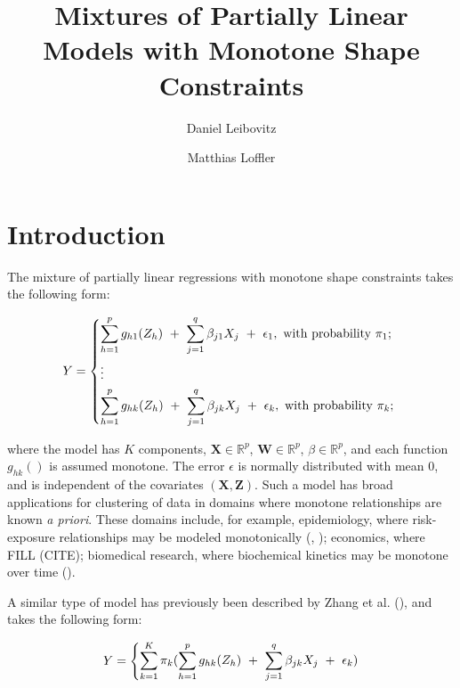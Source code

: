 \documentclass[fleqn,10pt]{olplainarticle}\usepackage[]{graphicx}\usepackage[]{color}
\title{Mixtures of Partially Linear Models with Monotone Shape Constraints}
\author[1]{Daniel Leibovitz}
\author[2]{Matthias Loffler}
\affil[1]{daniel.leibovitz@uzh.ch}
\affil[2]{matthias.loeffler@stat.math.ethz.ch}
\begin{document}
\flushbottom
\maketitle
\thispagestyle{empty}

\section{Introduction}

The mixture of partially linear regressions with monotone shape constraints takes the following form:

\begin{equation} \label{modstrucbrief}
  Y = 
  \begin{dcases}
    \sum_{h=1}^{p} g_{h1} (Z_{h}) \ +\  \sum_{j=1}^{q} \beta_{j1} X_{j} \ +\ \epsilon_1, \text{  with probability $\pi_1$; }\\
    \vdots \\
    \sum_{h=1}^{p} g_{hk} (Z_{h}) \ +\  \sum_{j=1}^{q} \beta_{jk} X_{j} \ +\ \epsilon_k, \text{  with probability $\pi_k$; } \\
  \end{dcases}
\end{equation}

where the model has $K$ components, $\boldsymbol{X} \in \mathbb{R}^p$, $\boldsymbol{W} \in \mathbb{R}^p$, $\beta \in \mathbb{R}^p$, and each function $g_{hk}()$ is assumed monotone. The error $\epsilon$ is normally distributed with mean $0$, and is independent of the covariates $(\boldsymbol{X}, \boldsymbol{Z})$. Such a model has broad applications for clustering of data in domains where monotone relationships are known \emph{a priori}. These domains include, for example, epidemiology, where risk-exposure relationships may be modeled monotonically (\cite{morton}, \cite{carcinogen}); economics, where FILL (CITE); biomedical research, where biochemical kinetics may be monotone over time (\cite{kinetics}). 


A similar type of model has previously been described by Zhang et al. (\cite{zhangetal}), and takes the following form:

\begin{equation} \label{zhangstruc}
  Y = 
  \begin{dcases}
    \sum_{k=1}^{K}\pi_k(\sum_{h=1}^{p} g_{hk} (Z_{h}) \ +\  \sum_{j=1}^{q} \beta_{jk} X_{j} \ +\ \epsilon_k) \\
  \end{dcases}
\end{equation}
\end{document}
